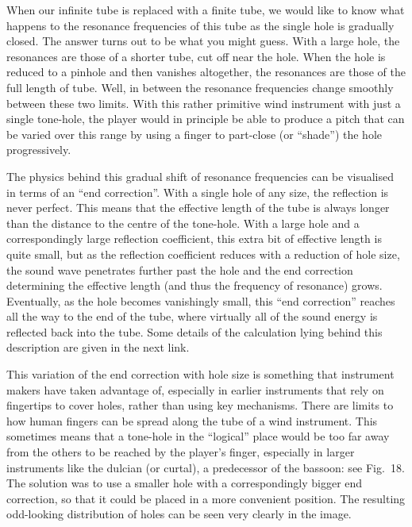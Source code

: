   When our infinite tube is replaced with a finite tube, we would like to know 
  what happens to the resonance frequencies of this tube as the single hole is 
  gradually closed. The answer turns out to be what you might guess. With a 
  large hole, the resonances are those of a shorter tube, cut off near the 
  hole. When the hole is reduced to a pinhole and then vanishes altogether, the 
  resonances are those of the full length of tube. Well, in between the 
  resonance frequencies change smoothly between these two limits. With this 
  rather primitive wind instrument with just a single tone-hole, the player 
  would in principle be able to produce a pitch that can be varied over this 
  range by using a finger to part-close (or “shade”) the hole progressively. 

  The physics behind this gradual shift of resonance frequencies can be 
  visualised in terms of an ``end correction''. With a single hole of any size, 
  the reflection is never perfect. This means that the effective length of the 
  tube is always longer than the distance to the centre of the tone-hole. With 
  a large hole and a correspondingly large reflection coefficient, this extra 
  bit of effective length is quite small, but as the reflection coefficient 
  reduces with a reduction of hole size, the sound wave penetrates further past 
  the hole and the end correction determining the effective length (and thus 
  the frequency of resonance) grows. Eventually, as the hole becomes 
  vanishingly small, this ``end correction'' reaches all the way to the end of 
  the tube, where virtually all of the sound energy is reflected back into the 
  tube. Some details of the calculation lying behind this description are given 
  in the next link. 

  This variation of the end correction with hole size is something that 
  instrument makers have taken advantage of, especially in earlier instruments 
  that rely on fingertips to cover holes, rather than using key mechanisms. 
  There are limits to how human fingers can be spread along the tube of a wind 
  instrument. This sometimes means that a tone-hole in the ``logical'' place 
  would be too far away from the others to be reached by the player's finger, 
  especially in larger instruments like the dulcian (or curtal), a predecessor 
  of the bassoon: see Fig.\ 18. The solution was to use a smaller hole with a 
  correspondingly bigger end correction, so that it could be placed in a more 
  convenient position. The resulting odd-looking distribution of holes can be 
  seen very clearly in the image. 


